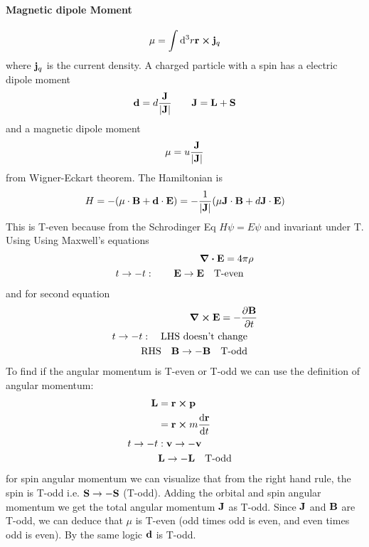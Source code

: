 \documentclass[../main.tex]{subfiles}
\begin{document}
\paragraph*{Magnetic dipole Moment}
\begin{align*}
    \vb \mu = \int \dd^3 r \vb r \cross \vb j_q
\end{align*}
where $\vb j_q$ is the current density. A charged particle with a spin has a electric dipole moment
\begin{align*}
    \vb d = d \frac{\vb J}{\abs{\vb J}} \qquad \vb J = \vb L + \vb S
\end{align*}
and a magnetic dipole moment
\begin{align*}
    \vb \mu = u \frac{\vb J}{\abs{\vb J}}
\end{align*}
from Wigner-Eckart theorem. The Hamiltonian is
\begin{align*}
    H = -(\mu \cdot \vb B + \vb d \cdot \vb E)
        = -\frac{1}{\abs{\vb J}}(\mu \vb J \cdot \vb B + d \vb J \cdot \vb E)
\end{align*}
This is T-even because from the Schrodinger Eq $H\psi = E \psi$ and invariant under T. Using 
Using Maxwell's equations
\begin{align*}
    \div \vb E = 4\pi \rho \\
    t \to -t: \qquad \vb E \to \vb E \qqtext{T-even}
\end{align*}
and for second equation
\begin{align*}
    \curl \vb E = -\pdv{\vb B}{t} \\
    t \to -t: \qqtext{LHS doesn't change} \\
    \qqtext{RHS} \vb B \to -\vb B \qqtext{T-odd}
\end{align*}
To find if the angular momentum is T-even or T-odd we can use the definition of angular momentum:
\begin{align*}
    \vb L &= \vb r \cross \vb p \\
    &= \vb r \cross m \dv{\vb r}{t} \\
    t \to -t&: \vb v \to -\vb{v} \\
    & \vb L \to -\vb L \qqtext{T-odd}
\end{align*}
for spin angular momentum we can visualize that from the right hand rule, the spin is T-odd i.e.
$\vb S \to -\vb S$ (T-odd). Adding the orbital and spin angular momentum we get the total angular
momentum $\vb J$ as T-odd. Since $\vb J$ and $\vb B$ are T-odd, we can deduce that $\mu$ is T-even
(odd times odd is even, and even times odd is even). By the same logic $\vb d$ is T-odd.
\end{document}
